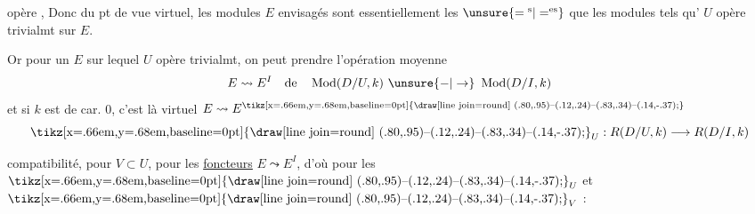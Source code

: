 opère ,  Donc du pt de vue virtuel,  les modules $E$ envisagés sont essentiellement les $\unsure{={}^{\mathrm{s}}|=^{\mathrm{es}}}$ que les modules tels qu' $U$ opère trivialmt sur $E$.

Or pour un $E$ sur lequel $U$ opère trivialmt, on peut prendre l'opération moyenne
\[
 E\leadsto E^I \quad \text{de}\quad \operatorname{Mod}(D/U,k)\ \unsure{\mathord{-}|\to}\ \operatorname{Mod}(D/I,k)
\]
et si $k$ est de car. $0$, c'est là     virtuel  $E\leadsto E^{\mathord{\text{\tikz[x=.66em,y=.68em,baseline=0pt]{\draw[line join=round] (.80,.95)--(.12,.24)--(.83,.34)--(.14,-.37);}}}}$
\[
 \mathord{\text{\tikz[x=.66em,y=.68em,baseline=0pt]{\draw[line join=round] (.80,.95)--(.12,.24)--(.83,.34)--(.14,-.37);}}}_U:R(D/U,k)\longrightarrow R(D/I,k)
\]

  compatibilité, pour $V\subset U$, pour les \uline{foncteurs} $E\leadsto E^I$, d'où pour les $\mathord{\text{\tikz[x=.66em,y=.68em,baseline=0pt]{\draw[line join=round] (.80,.95)--(.12,.24)--(.83,.34)--(.14,-.37);}}}_U$ et $\mathord{\text{\tikz[x=.66em,y=.68em,baseline=0pt]{\draw[line join=round] (.80,.95)--(.12,.24)--(.83,.34)--(.14,-.37);}}}_V$ :
